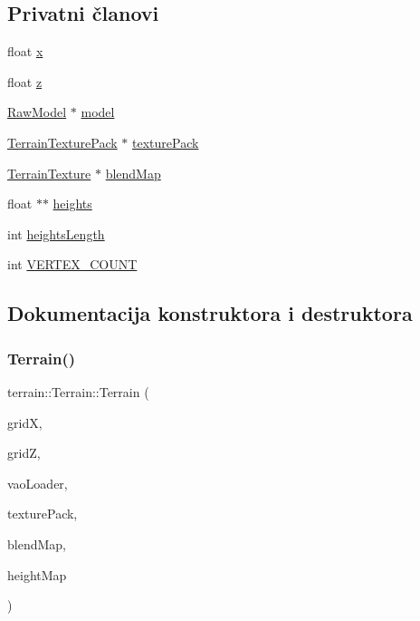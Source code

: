 \subsection*{Privatni članovi}
\begin{DoxyCompactItemize}
\item 
float \hyperlink{classterrain_1_1Terrain_aec56d6e8219539617090b8e99b89be29}{x}
\item 
float \hyperlink{classterrain_1_1Terrain_aaa4c36ce01096f81a0ee174c36f19657}{z}
\item 
\hyperlink{classmodel_1_1RawModel}{Raw\+Model} $\ast$ \hyperlink{classterrain_1_1Terrain_a0811e4548a966a38b3ca6a4475666324}{model}
\item 
\hyperlink{classtexture_1_1TerrainTexturePack}{Terrain\+Texture\+Pack} $\ast$ \hyperlink{classterrain_1_1Terrain_a6f9e86bd4c98ec61c9588b9f2b57fb75}{texture\+Pack}
\item 
\hyperlink{classtexture_1_1TerrainTexture}{Terrain\+Texture} $\ast$ \hyperlink{classterrain_1_1Terrain_a48d20417020f61e62bb5d3a497c62a57}{blend\+Map}
\item 
float $\ast$$\ast$ \hyperlink{classterrain_1_1Terrain_a068874d68315a2dafb59630e6d9410f1}{heights}
\item 
int \hyperlink{classterrain_1_1Terrain_a797e69c6650b5870643574625f853718}{heights\+Length}
\item 
int \hyperlink{classterrain_1_1Terrain_a27ca93bfb1ba44b0ff2935d667614f71}{V\+E\+R\+T\+E\+X\+\_\+\+C\+O\+U\+NT}
\end{DoxyCompactItemize}


\subsection{Dokumentacija konstruktora i destruktora}
\mbox{\label{classterrain_1_1Terrain_a3361d2b8405cb829d0b851a944bce94b}} 
\subsubsection{\texorpdfstring{Terrain()}{Terrain()}}
{\footnotesize\ttfamily terrain\+::\+Terrain\+::\+Terrain (\begin{DoxyParamCaption}\item[{float}]{gridX,  }\item[{float}]{gridZ,  }\item[{\hyperlink{classcore_1_1VaoLoader}{Vao\+Loader} $\ast$}]{vao\+Loader,  }\item[{\hyperlink{classtexture_1_1TerrainTexturePack}{Terrain\+Texture\+Pack} $\ast$}]{texture\+Pack,  }\item[{\hyperlink{classtexture_1_1TerrainTexture}{Terrain\+Texture} $\ast$}]{blend\+Map,  }\item[{const char $\ast$}]{height\+Map }\end{DoxyParamCaption})}

